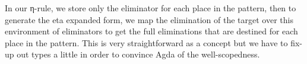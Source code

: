 In our η-rule, we store only the eliminator for each place in the pattern,
then to generate the eta expanded form, we map the elimination of the target
over this environment of eliminators to get the full eliminations that
are destined for each place in the pattern. This is very straightforward
as a concept but we have to fix-up out types a little in order to convince
Agda of the well-scopedness.

\begin{code}%
\>[0]\AgdaSpace{}%
\AgdaSpace{}%
\AgdaSymbol{:}\AgdaSpace{}%
\AgdaSpace{}%
\<%
\\
\>[0][@{}l@{\AgdaIndent{0}}]%
\>[2]\AgdaSpace{}%
\<%
\\
%
\\[\AgdaEmptyExtraSkip]%
%
\>[2]\<%
\\
\>[2][@{}l@{\AgdaIndent{0}}]%
\>[4]%
\>[17]\AgdaSymbol{:}%
\>[20]\<%
\\
%
\>[4]%
\>[17]\AgdaSymbol{:}%
\>[20]\AgdaSpace{}%
\AgdaSpace{}%
\<%
\\
%
\\[\AgdaEmptyExtraSkip]%
%
\>[2]\AgdaSpace{}%
\AgdaSymbol{:}\AgdaSpace{}%
\AgdaSymbol{(}\AgdaSpace{}%
\AgdaSymbol{:}\AgdaSpace{}%
\AgdaSpace{}%
\AgdaSymbol{)}\AgdaSpace{}%
\AgdaSpace{}%
\AgdaSpace{}%
\AgdaSymbol{((}\AgdaSpace{}%
\AgdaSpace{}%
\AgdaSpace{}%
\AgdaSymbol{)}\AgdaSpace{}%
\AgdaSymbol{)}\<%
\\
%
\>[2]\AgdaSpace{}%
\AgdaSpace{}%
%
\>[19]\AgdaSpace{}%
\AgdaSpace{}%
\AgdaSymbol{(}\AgdaSpace{}%
\AgdaSymbol{)}\<%
\\
%
\>[2]\AgdaSpace{}%
\AgdaSymbol{|}\AgdaSpace{}%
\AgdaSpace{}%
\AgdaSymbol{=}\AgdaSpace{}%
\AgdaSpace{}%
\<%
\\
%
\>[2]\AgdaSpace{}%
\AgdaSymbol{|}\AgdaSpace{}%
\AgdaSpace{}%

\end{code}

